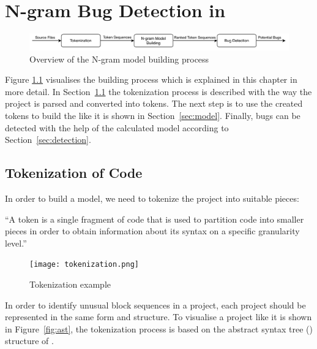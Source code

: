 \chapter{N-gram Bug Detection in \scratch{}}\label{chap:methods}

\begin{figure}[hbtp]
\centering
\includegraphics[scale=0.75]{images/Overview.pdf}
\caption{Overview of the N-gram model building process}
\label{fig:overview}
\end{figure}

Figure \ref{fig:overview} visualises the \ngram{} building process which is explained in this chapter in more detail. In Section~\ref{sec:tokenization} the tokenization process is described with the way the \scratch{} project is parsed and converted into tokens. The next step is to use the created tokens to build the \ngram{} like it is shown in Section~\ref{sec:model}. Finally, bugs can be detected with the help of the calculated model according to Section~\ref{sec:detection}.

\section{Tokenization of \scratch{} Code}\label{sec:tokenization}
In order to build a model, we need to tokenize the \scratch{} project into suitable pieces:

\begin{definition}[Token]\label{def:token}
    ``A token is a single fragment of \scratch{} code that is used to partition code into smaller pieces in order to obtain information about its syntax on a specific granularity level.''
\end{definition}


\begin{figure}[t]
    \centering
    \texttt{[image: tokenization.png]}
    \caption[Tokenization example]{\label{fig:tokenization} Tokenization example}
\end{figure}

In order to identify unusual block sequences in a \scratch{} project, each project should be represented in the same form and structure. To visualise a \scratch{} project like it is shown in Figure~\ref{fig:ast}, the tokenization process is based on the abstract syntax tree (\AST{}) structure of \litterbox{}. 

